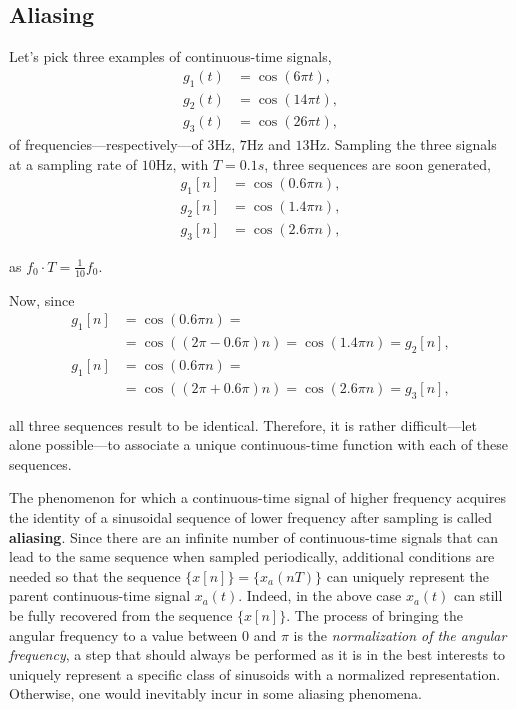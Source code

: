 \documentclass[\documentfontsize, twocolumn]{\classname}
\begin{document}
\subsection{Aliasing}

Let's pick three examples of con\-ti\-nuo\-us-time signals,
\begin{align*}
    g_1(t) &= \cos{(6\pi t)}, \\
    g_2(t) &= \cos{(14\pi t)}, \\
    g_3(t) &= \cos{(26\pi t)},
\end{align*}
of frequencies---respectively---of $3$Hz, $7$Hz and $13$Hz. Sampling the three signals at a sampling rate of $10$Hz, with $T=0.1s$, three se\-quen\-ces are soon generated,
\begin{align*}
    g_1[n] &= \cos{(0.6\pi n)}, \\
    g_2[n] &= \cos{(1.4\pi n)}, \\
    g_3[n] &= \cos{(2.6\pi n)},
\end{align*}

as $f_0 \cdot T = \frac{1}{10}f_0$.

Now, since
\begin{align*}
    g_1[n] &= \cos{(0.6\pi n)} =\\
           &= \cos{((2\pi - 0.6\pi)n)} = \cos{(1.4\pi n)} = g_2[n], \\
    g_1[n] &= \cos{(0.6\pi n)} =\\
           &= \cos{((2\pi + 0.6\pi)n)} = \cos{(2.6\pi n)} = g_3[n],
\end{align*}

all three se\-quen\-ces result to be identical. Therefore, it is rather difficult---let alone possible---to associate a unique con\-ti\-nuo\-us-time function with each of these se\-quen\-ces.

The phenomenon for which a con\-ti\-nuo\-us-time signal of high\-er frequency acquires the identity of a sinusoidal se\-quen\-ce of lower frequency after sampling is called \textbf{aliasing}. Since there are an infinite number of con\-ti\-nuo\-us-time signals that can lead to the same se\-quen\-ce when sampled periodically, additional conditions are needed so that the se\-quen\-ce $\{x[n]\} = \{x_a(nT)\}$ can uniquely represent the parent con\-ti\-nuo\-us-time signal $x_a(t)$. Indeed, in the above case $x_a(t)$ can still be fully recovered from the se\-quen\-ce $\{x[n]\}$. The process of bringing the angular frequency to a value between $0$ and $\pi$ is the \emph{normalization of the angular frequency}, a step that should always be performed as it is in the best interests to uniquely represent a specific class of sinusoids with a normalized representation. 
Otherwise, one would inevitably incur in some aliasing phenomena.
\end{document}
